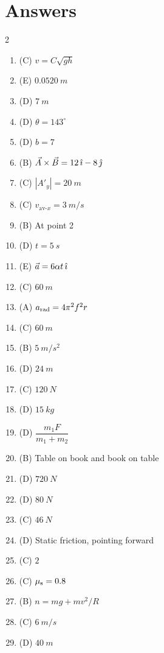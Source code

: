 \documentclass[11pt,a4paper]{article}
\begin{document}
\section*{Answers}
\begin{multicols}{2}\raggedcolumns
\begin{enumerate}[label=\textsf{\arabic*.},leftmargin=2.2em,itemsep=0.35em]
\item (C) \enspace $v = C\sqrt{gh}$
\item (E) \enspace $\qty{0.0520}{m}$
\item (D) \enspace $\qty{7}{m}$
\item (D) \enspace $\theta = 143^\circ$
\item (D) \enspace $b = 7$
\item (B) \enspace $\vec{A}\times\vec{B} = 12\,\hat{\imath} - 8\,\hat{\jmath}$
\item (C) \enspace $|A'_y| = \qty{20}{m}$
\item (C) \enspace $v_{\mathrm{av}\text{-}x} = \qty{3}{m/s}$
\item (B) \enspace At point 2
\item (D) \enspace $t = \qty{5}{s}$
\item (E) \enspace $\vec{a} = 6\alpha t\,\hat{\imath}$
\item (C) \enspace $\qty{60}{m}$
\item (A) \enspace $a_{\mathrm{rad}} = 4\pi^2 f^2 r$
\item (C) \enspace $\qty{60}{m}$
\item (B) \enspace $\qty{5}{m/s^2}$
\item (D) \enspace $\qty{24}{m}$
\item (C) \enspace $\qty{120}{N}$
\item (D) \enspace $\qty{15}{kg}$
\item (D) \enspace $\dfrac{m_1 F}{m_1 + m_2}$
\item (B) \enspace Table on book and book on table
\item (D) \enspace $\qty{720}{N}$
\item (D) \enspace $\qty{80}{N}$
\item (C) \enspace $\qty{46}{N}$
\item (D) \enspace Static friction, pointing forward
\item (C) \enspace $2$
\item (C) \enspace $\mu_{\mathrm{s}} = 0.8$
\item (B) \enspace $n = mg + mv^2/R$
\item (C) \enspace $\qty{6}{m/s}$
\item (D) \enspace $\qty{40}{m}$

\end{enumerate}
\end{multicols}
\end{document}
